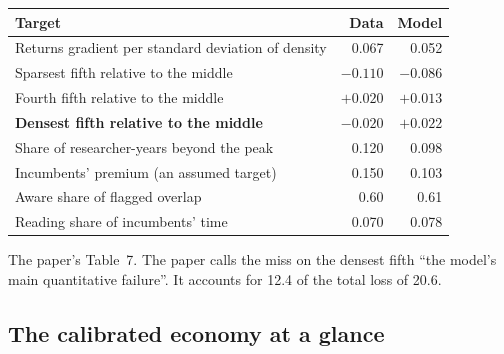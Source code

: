 \begin{center}\small
\begin{tabularx}{0.82\textwidth}{@{}Lrr@{}}
\toprule
Target & Data & Model \\
\midrule
Returns gradient per standard deviation of density & 0.067 & 0.052 \\
Sparsest fifth relative to the middle & $-0.110$ & $-0.086$ \\
Fourth fifth relative to the middle & $+0.020$ & $+0.013$ \\
\textbf{Densest fifth relative to the middle} & $\mathbf{-0.020}$ & $\mathbf{+0.022}$ \\
Share of researcher-years beyond the peak & 0.120 & 0.098 \\
Incumbents' premium (an assumed target) & 0.150 & 0.103 \\
Aware share of flagged overlap & 0.60 & 0.61 \\
Reading share of incumbents' time & 0.070 & 0.078 \\
\bottomrule
\end{tabularx}
\par\smallskip
\parbox{0.82\textwidth}{\footnotesize The paper's Table~7. The paper calls the miss on the densest fifth ``the model's main quantitative failure''. It accounts for 12.4 of the total loss of 20.6.}
\end{center}

\subsection{The calibrated economy at a glance}

